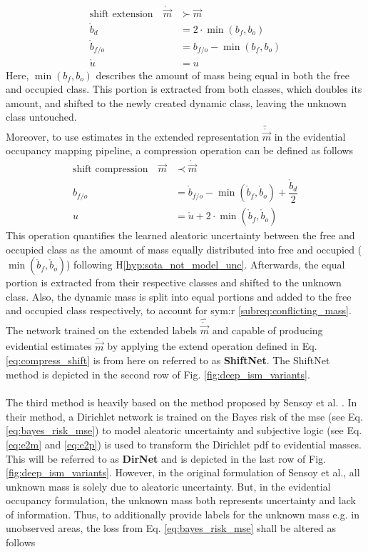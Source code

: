 \begin{align}
	\label{eq:extend_shift}
	\text{shift extension} \quad\mathring{\vec{m}} &\succ \vec{m}\\
	\mathring{b}_d &= 2\cdot \min(b_f,b_o)\\
	\mathring{b}_{f/o} &= b_{f/o} - \min(b_f,b_o)\\
	\mathring{u} &= u
\end{align}
Here, $\min(b_f,b_o)$ describes the amount of mass being equal in both the free and occupied class. This portion is extracted from both classes, which doubles its amount, and shifted to the newly created dynamic class, leaving the unknown class untouched.\\ 
Moreover, to use estimates in the extended representation $\tilde{\mathring{\vec{m}}}$ in the evidential occupancy mapping pipeline, a compression operation can be defined as follows
\begin{align}
	\label{eq:compress_shift}
	\text{shift compression} \quad\vec{m} &\prec \mathring{\vec{m}}\\
	b_{f/o} &= \mathring{b}_{f/o} - \min(\mathring{b}_f,\mathring{b}_o) + \dfrac{\mathring{b}_d}{2}\\
	u &= \mathring{u} + 2\cdot\min(\mathring{b}_f,\mathring{b}_o)
\end{align}
This operation quantifies the learned aleatoric uncertainty between the free and occupied class as the amount of mass equally distributed into free and occupied ($\min(\mathring{b}_f,\mathring{b}_o)$) following H\ref{hyp:sota_not_model_unc}. Afterwards, the equal portion is extracted from their respective classes and shifted to the unknown class. Also, the dynamic mass is split into equal portions and added to the free and occupied class respectively, to account for \gls{sym:r} \ref{subreq:conflicting_mass}. The network trained on the extended labels $\hat{\mathring{\vec{m}}}$ and capable of producing evidential estimates $\tilde{\vec{m}}$ by applying the extend operation defined in Eq. \ref{eq:compress_shift} is from here on referred to as \textbf{ShiftNet}. The ShiftNet method is depicted in the second row of Fig. \ref{fig:deep_ism_variants}.
\\\\
The third method is heavily based on the method proposed by Sensoy et al. \cite{sensoy2018evidential}. In their method, a Dirichlet network is trained on the Bayes risk of the \gls{mse} (see Eq. \ref{eq:bayes_risk_mse}) to model aleatoric uncertainty and subjective logic (see Eq. \ref{eq:e2m} and \ref{eq:e2p}) is used to transform the Dirichlet \gls{pdf} to evidential masses. This will be referred to as \textbf{DirNet} and is depicted in the last row of Fig. \ref{fig:deep_ism_variants}. However, in the original formulation of Sensoy et al., all unknown mass is solely due to aleatoric uncertainty. But, in the evidential occupancy formulation, the unknown mass both represents uncertainty and lack of information. Thus, to additionally provide labels for the unknown mass e.g. in unobserved areas, the loss from Eq. \ref{eq:bayes_risk_mse} shall be altered as follows
